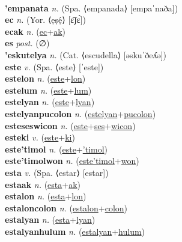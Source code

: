  \label{'emoci} \\
\textbf{'empanata} \textit{n.} (Spa. ⟨empanada⟩ [empaˈnaða])
 \label{'empanata} \\
\textbf{ec} \textit{n.} (Yor. ⟨ẹṣẹ́⟩ [ɛ̄ʃɛ́])
 \label{ec} \\
\textbf{ecak} \textit{n.} (\hyperref[ec]{ec}+\hyperref[ak]{ak})
 \label{ecak} \\
\textbf{es} \textit{post.} (∅)
 \label{es} \\
\textbf{'eskutelya} \textit{n.} (Cat. ⟨escudella⟩ [əskuˈðeʎə])
 \label{'eskutelya} \\
\textbf{este} \textit{v.} (Spa. ⟨este⟩ [ˈeste])
 \label{este} \\
\textbf{estelon} \textit{n.} (\hyperref[este]{este}+\hyperref[lon]{lon})
 \label{estelon} \\
\textbf{estelum} \textit{n.} (\hyperref[este]{este}+\hyperref[lum]{lum})
 \label{estelum} \\
\textbf{estelyan} \textit{n.} (\hyperref[este]{este}+\hyperref[lyan]{lyan})
 \label{estelyan} \\
\textbf{estelyanpucolon} \textit{n.} (\hyperref[estelyan]{estelyan}+\hyperref[pucolon]{pucolon})
 \label{estelyanpucolon} \\
\textbf{esteseswicon} \textit{n.} (\hyperref[este]{este}+\hyperref[ses]{ses}+\hyperref[wicon]{wicon})
 \label{esteseswicon} \\
\textbf{esteki} \textit{v.} (\hyperref[este]{este}+\hyperref[ki]{ki})
 \label{esteki} \\
\textbf{este'timol} \textit{n.} (\hyperref[este]{este}+\hyperref['timol]{'timol})
 \label{este'timol} \\
\textbf{este'timolwon} \textit{n.} (\hyperref[este'timol]{este'timol}+\hyperref[won]{won})
 \label{este'timolwon} \\
\textbf{esta} \textit{v.} (Spa. ⟨estar⟩ [estar])
 \label{esta} \\
\textbf{estaak} \textit{n.} (\hyperref[esta]{esta}+\hyperref[ak]{ak})
 \label{estaak} \\
\textbf{estalon} \textit{n.} (\hyperref[esta]{esta}+\hyperref[lon]{lon})
 \label{estalon} \\
\textbf{estaloncolon} \textit{n.} (\hyperref[estalon]{estalon}+\hyperref[colon]{colon})
 \label{estaloncolon} \\
\textbf{estalyan} \textit{n.} (\hyperref[esta]{esta}+\hyperref[lyan]{lyan})
 \label{estalyan} \\
\textbf{estalyanhulum} \textit{n.} (\hyperref[estalyan]{estalyan}+\hyperref[hulum]{hulum})
